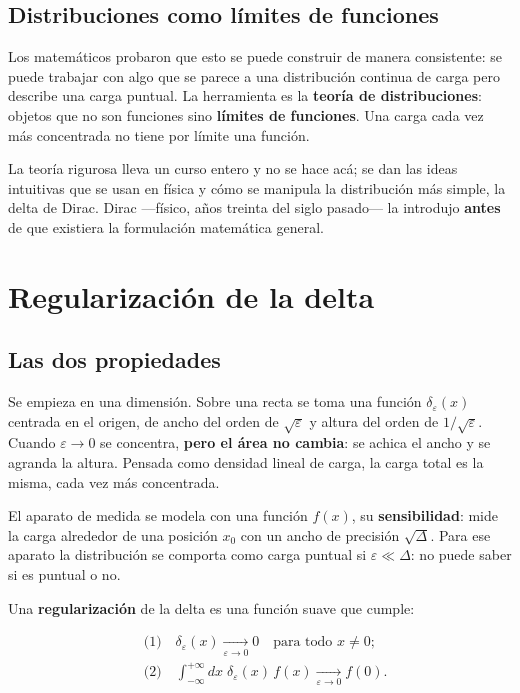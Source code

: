 \documentclass[12pt,a4paper]{article}
\begin{document}
\subsection{Distribuciones como límites de funciones}

Los matemáticos probaron que esto se puede construir de manera consistente: se
puede trabajar con algo que se parece a una distribución continua de carga pero
describe una carga puntual. La herramienta es la \textbf{teoría de distribuciones}:
objetos que no son funciones sino \textbf{límites de funciones}. Una carga cada vez
más concentrada no tiene por límite una función.

La teoría rigurosa lleva un curso entero y no se hace acá; se dan las ideas
intuitivas que se usan en física y cómo se manipula la distribución más simple,
la delta de Dirac. Dirac ---físico, años treinta del siglo pasado--- la introdujo
\textbf{antes} de que existiera la formulación matemática general.

\section{Regularización de la delta}

\subsection{Las dos propiedades}

Se empieza en una dimensión. Sobre una recta se toma una función
$\delta_\varepsilon(x)$ centrada en el origen, de ancho del orden de
$\sqrt\varepsilon$ y altura del orden de $1/\sqrt\varepsilon$. Cuando
$\varepsilon\to0$ se concentra, \textbf{pero el área no cambia}: se achica el ancho
y se agranda la altura. Pensada como densidad lineal de carga, la carga total
es la misma, cada vez más concentrada.

El aparato de medida se modela con una función $f(x)$, su \textbf{sensibilidad}:
mide la carga alrededor de una posición $x_0$ con un ancho de precisión
$\sqrt\Delta$. Para ese aparato la distribución se comporta como carga puntual
si $\varepsilon\ll\Delta$: no puede saber si es puntual o no.

Una \textbf{regularización} de la delta es una función suave que cumple:

\begin{keybox}
\[
\boxed{\ \begin{aligned}
&\text{(1)}\quad \delta_\varepsilon(x)\xrightarrow[\varepsilon\to0]{}0
\quad\text{para todo } x\neq0;\\[4pt]
&\text{(2)}\quad \int_{-\infty}^{+\infty} dx\;\delta_\varepsilon(x)\,f(x)
\xrightarrow[\varepsilon\to0]{} f(0).
\end{aligned}\ }
\]
\end{keybox}
\end{document}
